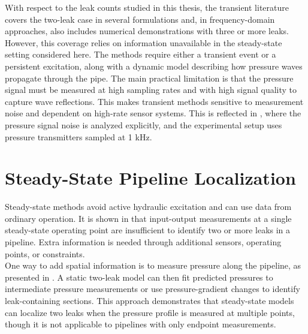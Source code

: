 With respect to the leak counts studied in this thesis, the transient literature covers the two-leak case in several formulations and, in frequency-domain approaches, also includes numerical demonstrations with three or more leaks. However, this coverage relies on information unavailable in the steady-state setting considered here. The methods require either a transient event or a persistent excitation, along with a dynamic model describing how pressure waves propagate through the pipe. The main practical limitation is that the pressure signal must be measured at high sampling rates and with high signal quality to capture wave reflections. This makes transient methods sensitive to measurement noise and dependent on high-rate sensor systems. This is reflected in \cite{nadian2025}, where the pressure signal noise is analyzed explicitly, and the experimental setup uses pressure transmitters sampled at 1 kHz.

\section{Steady-State Pipeline Localization}
\label{sec:lit:steadystate}

Steady-state methods avoid active hydraulic excitation and can use data from ordinary operation. It is shown in \cite{verde2003} that input-output measurements at a single steady-state operating point are insufficient to identify two or more leaks in a pipeline. Extra information is needed through additional sensors, operating points, or constraints.\\

One way to add spatial information is to measure pressure along the pipeline, as presented in \cite{ostapkowicz2023}. A static two-leak model can then fit predicted pressures to intermediate pressure measurements or use pressure-gradient changes to identify leak-containing sections. This approach demonstrates that steady-state models can localize two leaks when the pressure profile is measured at multiple points, though it is not applicable to pipelines with only endpoint measurements.\\

